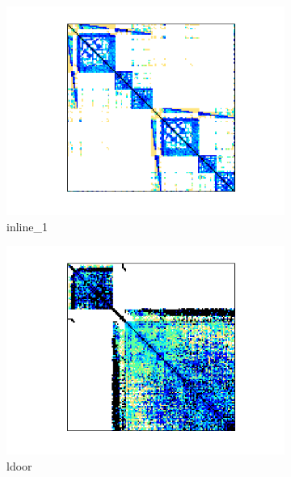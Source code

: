 \begin{figure}[H]
\begin{subfigure}[b]{0.3\textwidth}
        \includegraphics[width=\textwidth]{./images/CG/inline_1}
        \caption{inline\_1}
    \end{subfigure}
    \quad 
    \begin{subfigure}[b]{0.3\textwidth}
        \includegraphics[width=\textwidth]{./images/CG/ldoor.png}
        \caption{ldoor}
    \end{subfigure}
    \quad 
    \begin{subfigure}[b]{0.3\textwidth}

\end{subfigure}
\end{figure}
